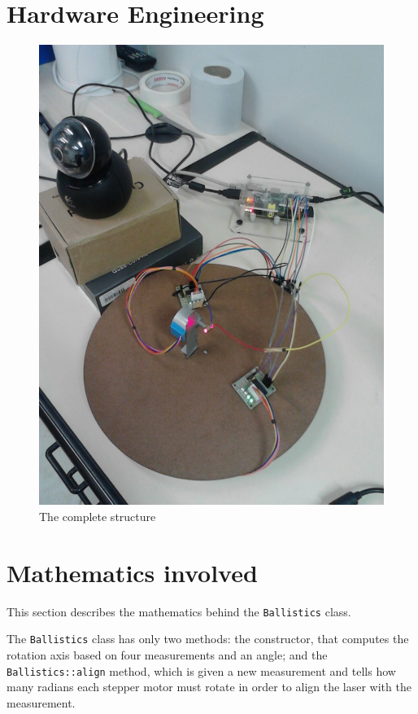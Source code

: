 \documentclass{article}
\newcommand\class[1]{\texttt{#1}}
\newcommand\method[1]{\texttt{#1}}
\begin{document}
\section{Hardware Engineering}

\begin{figure}[h!]
    \includegraphics[scale=0.2]{imgs/hardware.jpg}
    \caption{The complete structure}
    \label{fig:img1}
\end{figure}

\section{Mathematics involved}

This section describes the mathematics behind the \class{Ballistics} class.

The \class{Ballistics} class has only two methods: the constructor,
that computes the rotation axis based on four measurements and an angle;
and the \method{Ballistics::align} method,
which is given a new measurement and tells how many radians
each stepper motor must rotate in order to align the laser with the measurement.
\end{document}
